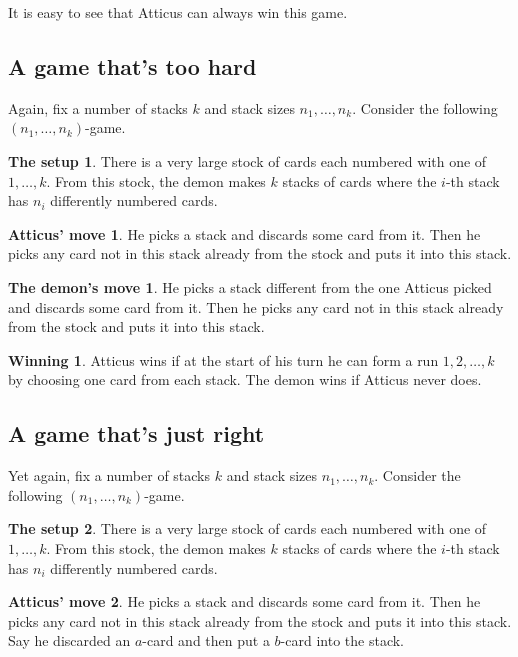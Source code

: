 \documentclass[12pt]{article}
\theoremstyle{plain}
\theoremstyle{definition}
\newtheorem*{setup}{The setup}
\newtheorem*{atticus}{Atticus' move}
\newtheorem*{demon}{The demon's move}
\newtheorem*{winning}{Winning}
\theoremstyle{remark}
\begin{document}
\noindent It is easy to see that Atticus can always win this game.

\subsection{A game that's too hard}
Again, fix a number of stacks $k$ and stack sizes $n_1, \ldots, n_k$.  Consider the following $(n_1, \ldots, n_k)$-game.

\begin{setup}
There is a very large stock of cards each numbered with one of $1, \ldots, k$.  From this stock, the demon makes $k$ stacks of cards where the $i$-th stack has $n_i$ differently numbered cards.
\end{setup}

\begin{atticus}
He picks a stack and discards some card from it.  Then he picks any card not in this stack already from the stock and puts it into this stack.
\end{atticus}

\begin{demon}
He picks a stack different from the one Atticus picked and discards some card from it.  Then he picks any card not in this stack already from the stock and puts it into this stack.
\end{demon}

\begin{winning}
Atticus wins if at the start of his turn he can form a run $1, 2, \ldots, k$ by choosing one card from each stack.  The demon wins if Atticus never does.
\end{winning}

\subsection{A game that's just right}
Yet again, fix a number of stacks $k$ and stack sizes $n_1, \ldots, n_k$.  Consider the following $(n_1, \ldots, n_k)$-game.

\begin{setup}
There is a very large stock of cards each numbered with one of $1, \ldots, k$.  From this stock, the demon makes $k$ stacks of cards where the $i$-th stack has $n_i$ differently numbered cards.
\end{setup}

\begin{atticus}
He picks a stack and discards some card from it.  Then he picks any card not in this stack already from the stock and puts it into this stack.
Say he discarded an $a$-card and then put a $b$-card into the stack.
\end{atticus}
\end{document}

